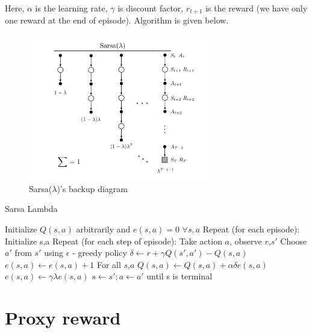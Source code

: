 Here, $\alpha$ is the learning rate, $\gamma$ is discount factor, $r_{t+1}$ is the reward (we have only 
one reward at the end of episode). Algorithm is given below.


\begin{figure}[!htb]
    \centering
    \includegraphics[width=0.7\textwidth]{backup_sarsa}
    \caption{ Sarsa($\lambda$)'s backup diagram \cite{BOOK:1} }
    \label{image-myimage20} 
\end{figure}

\begin{algorithm}[H]
\caption{ Sarsa Lambda \cite{BOOK:1} }
\begin{algorithmic}
\State Initialize $Q(s,a)$ arbitrarily and $e(s,a) = 0$ $\forall s,a$
\State Repeat (for each episode):
\State \;\;\;\;\;\;Initialize s,a    
\State \;\;\;\;\;\;Repeat (for each step of episode):
\State \;\;\;\;\;\;\;\;\;\;\;\; Take action $a$, observe $r$,$s'$
\State \;\;\;\;\;\;\;\;\;\;\;\; Choose $a'$ from $s'$ using $\epsilon$ - greedy policy
\State \;\;\;\;\;\;\;\;\;\;\;\; $\delta \gets r + \gamma Q(s',a') - Q(s,a)$
\State \;\;\;\;\;\;\;\;\;\;\;\; $e(s,a) \gets e(s,a) + 1$
\State \;\;\;\;\;\;\;\;\;\;\;\; For all $s$,$a$
\State \;\;\;\;\;\;\;\;\;\;\;\;\;\;\;\;\;\; $Q(s,a) \gets Q(s,a) + \alpha \delta e(s,a)$
\State \;\;\;\;\;\;\;\;\;\;\;\;\;\;\;\;\;\; $e(s,a) \gets \gamma \lambda e(s,a)$
\State \;\;\;\;\;\;\;\;\;\;\;\; $s \gets s'; a \gets a'$
\State \;\;\;\;\;\; until s is terminal
\end{algorithmic}
\end{algorithm}


\vspace{1.0in}
\section{Proxy reward}

